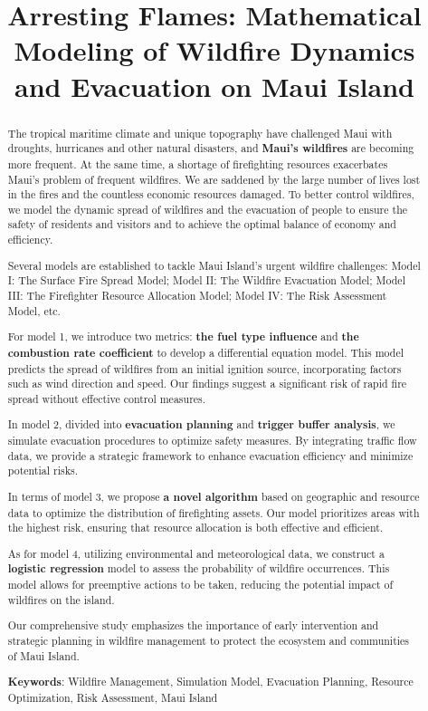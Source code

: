 \documentclass[12pt]{article}  %
\title{Arresting Flames: Mathematical Modeling of Wildfire Dynamics and Evacuation on Maui Island}  %
\begin{document}
%
\begin{abstract}
    
The tropical maritime climate and unique topography have challenged Maui with droughts, hurricanes and other natural disasters, and \textbf{Maui's wildfires} are becoming more frequent. At the same time, a shortage of firefighting resources exacerbates Maui's problem of frequent wildfires. We are saddened by the large number of lives lost in the fires and the countless economic resources damaged. To better control wildfires, we model the dynamic spread of wildfires and the evacuation of people to ensure the safety of residents and visitors and to achieve the optimal balance of economy and efficiency.

Several models are established to tackle Maui Island's urgent wildfire challenges: Model I: The Surface Fire Spread Model; Model II: The Wildfire Evacuation Model; Model III: The Firefighter Resource Allocation Model; Model IV: The Risk Assessment Model, etc. 

For model 1, we introduce two metrics: \textbf{the fuel type influence} and \textbf{the combustion rate coefficient} to develop a differential equation model. This model predicts the spread of wildfires from an initial ignition source, incorporating factors such as wind direction and speed. Our findings suggest a significant risk of rapid fire spread without effective control measures.

In model 2, divided into \textbf{evacuation planning} and \textbf{trigger buffer analysis}, we simulate evacuation procedures to optimize safety measures. By integrating traffic flow data, we provide a strategic framework to enhance evacuation efficiency and minimize potential risks.

In terms of model 3, we propose \textbf{a novel algorithm} based on geographic and resource data to optimize the distribution of firefighting assets. Our model prioritizes areas with the highest risk, ensuring that resource allocation is both effective and efficient.

As for model 4, utilizing environmental and meteorological data, we construct a \textbf{logistic regression} model to assess the probability of wildfire occurrences. This model allows for preemptive actions to be taken, reducing the potential impact of wildfires on the island.

Our comprehensive study emphasizes the importance of early intervention and strategic planning in wildfire management to protect the ecosystem and communities of Maui Island.



    \vspace{5pt}  %
    \textbf{Keywords}: Wildfire Management, Simulation Model, Evacuation Planning, Resource Optimization, Risk Assessment, Maui Island
%
\end{abstract}
\end{document}
